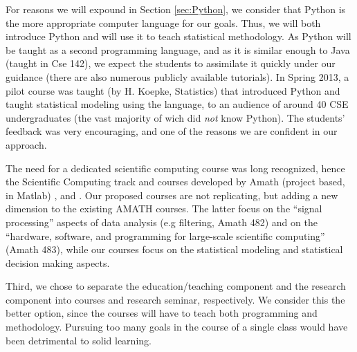 For reasons we will expound in Section \ref{sec:Python}, we
consider that Python is the more appropriate computer language for our
goals. Thus, we will both introduce Python and will use it to teach
statistical methodology.  As Python will be taught as a second
programming language, and as it is similar enough to Java (taught in
{\sc Cse 142}), we expect the students to assimilate it quickly under our
guidance (there are also numerous publicly available tutorials).
In Spring 2013, a pilot course was taught (by H. Koepke,
Statistics) that introduced Python and taught statistical modeling
using the language, to an audience of around 40 CSE undergraduates
(the vast majority of wich did {\em not} know Python). The students'
feedback was very encouraging, and one of the reasons we are confident
in our approach.

The need for a dedicated scientific computing course was long
recognized, hence the Scientific Computing track and courses developed
by {Amath } (project based, in Matlab) {}, and {}. 
Our proposed courses are not replicating, but adding a new dimension to
the existing AMATH courses. The latter focus on the ``signal
processing'' aspects of data analysis (e.g filtering, {\sc Amath
  482}) and on the ``hardware, software, and programming for
large-scale scientific computing'' ({\sc Amath 483}), while our
courses focus on the statistical modeling and statistical decision
making aspects.

Third, we chose to separate the education/teaching component and the
research component into courses and research seminar, respectively. We
consider this the better option, since the courses will have to teach
both programming and methodology. Pursuing too many goals in the
course of a single class would have been detrimental to solid learning.
 

